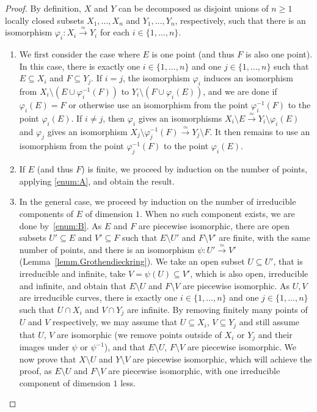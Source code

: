 \documentclass[JEP,XML,SOM,Unicode,NoFloatCountersInSection,published]{cedram}
\theoremstyle{definition}
\newcommand\iso{\stackrel{\simeq}{\longrightarrow}}
\begin{document}
\begin{proof}
By definition, $X$ and $Y$
can be decomposed as disjoint unions of $n \geq 1$ locally closed subsets $X_1, \ldots, X_n$ and
$Y_1, \ldots, Y_n$, respectively, such that there is an isomorphism $\varphi_i\colon X_i \iso Y_i$ for each $i\in \{1,\ldots,n\}$.

\begin{enumerate}\renewcommand{\theenumi}{\Alph{enumi}}
\item
\label{enum:A}
We first consider the case where $E$ is one point (and thus $F$ is also one point). In this case, there is exactly one $i\in \{1,\ldots,n\}$ and one $j\in \{1,\ldots,n\}$ such that $E \subseteq X_i$ and $F\subseteq Y_j$. If $i=j$, the isomorphism $\varphi_i$ induces an isomorphism from $X_i\setminus (E\cup \varphi_i^{-1} (F))$ to $Y_i\setminus (F\cup \varphi_i(E))$, and we are done if $\varphi_i(E)=F$ or otherwise use an isomorphism from the point $\varphi_i^{-1} (F)$ to the point $\varphi_i(E)$.
If $i\neq j$, then $\varphi_i$ gives an isomorphisms $X_i\setminus E\iso Y_i\setminus \varphi_i(E)$ and $\varphi_j$ gives an isomorphism $X_j\setminus \varphi_{j}^{-1}(F)\iso Y_j\setminus F$. It then remains to use an isomorphism from the point $\varphi_j^{-1} (F)$ to the point $\varphi_i(E)$.

\item\label{enum:B}
If $E$ (and thus $F$) is finite, we proceed by induction on the number of points, applying \eqref{enum:A}, and obtain the result.

\item\label{enum:C}
In the general case, we proceed by induction on the number of irreducible components of $E$ of dimension $1$. When no such component exists, we are done by~\eqref{enum:B}. As $E$ and $F$ are piecewise isomorphic, there are open subsets $U'\subseteq E$ and $V'\subseteq F$ such that $E\setminus U'$ and $F\setminus V'$ are finite, with the same number of points, and there is an isomorphism $\psi\colon U'\iso V'$ (Lemma~\ref{lemm.Grothendieckring}).
We take an open subset $U\subseteq U'$, that is irreducible and infinite, take $V=\psi(U)\subseteq V'$, which is also open, irreducible and infinite, and obtain that $E\setminus U$ and $F\setminus V$ are piecewise isomorphic.
As $U,V$ are irreducible curves, there is exactly one $i\in \{1,\ldots,n\}$ and one $j\in \{1,\ldots,n\}$ such that $U\cap X_i$ and $V\cap Y_j$ are infinite.
By removing finitely many points of $U$ and $V$ respectively, we may assume that $U\subseteq X_i$, $V\subseteq Y_j$ and still assume that $U$, $V$ are isomorphic (we remove points outside of $X_i$ or $Y_j$ and their images under $\psi$ or $\psi^{-1}$), and that $E\setminus U$, $F\setminus V$ are piecewise isomorphic.
We now prove that $X\setminus U$ and $Y\setminus V$ are piecewise isomorphic, which will achieve the proof, as $E\setminus U$ and $F\setminus V$ are piecewise isomorphic, with one irreducible component of dimension $1$ less.


\end{enumerate}
\end{proof}
\end{document}
